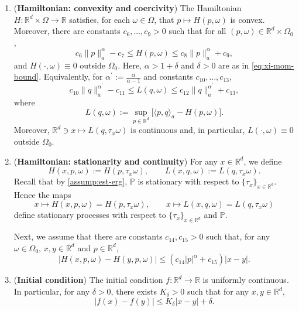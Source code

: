 \documentclass[11pt]{article}
\newcommand{\R}{\mathbb R}
\renewcommand{\P}{\mathbb P}
\theoremstyle{rem}
\begin{document}
\begin{enumerate}[label=\textbf{(H\arabic*)}]
\itemsep0.2em

\item \label{f2} ({\bf Hamiltonian: convexity and coercivity})
The Hamiltonian $H:\R^d\times\Omega\to\R$ satisfies, for each
$\omega\in\Omega$, that $p\mapsto H(p,\omega)$ is convex. Moreover, there are constants $c_6,\dots,c_9>0$ such that for all
$(p,\omega)\in\R^d\times\Omega_0$,
\begin{equation}\label{eq:H1-H}
c_6\|p\|_a^\alpha-c_7
\leq
H(p,\omega)
\leq
c_8\|p\|_a^\alpha+c_9,
\end{equation}
and $H(\cdot,\omega)\equiv 0$ outside $\Omega_0$. Here, $\alpha>1+\delta$ and $\delta>0$ are as in \eqref{eq:xi-mom-bound}. Equivalently, for
$\alpha^\prime:=\frac{\alpha}{\alpha-1}$ and constants $c_{10},\dots,c_{13}$,
\begin{equation}\label{eq:H1-L}
c_{10}\|q\|_a^{\alpha^\prime}-c_{11}
\leq
L(q,\omega)
\leq
c_{12}\|q\|_a^{\alpha^\prime}+c_{13},
\end{equation}
where
\begin{equation}\label{def L}
L(q,\omega):=\sup_{p\in\R^d}
\big[
\langle p,q\rangle_a-H(p,\omega)
\big].
\end{equation}
Moreover, $\R^d\ni x\mapsto L(q,\tau_x\omega)$ is continuous and, in particular,
$L(\cdot,\omega)\equiv 0$ outside $\Omega_0$.

\item \label{f3} ({\bf Hamiltonian: stationarity and continuity})
For any $x\in\R^d$, we define
\[
H(x,p,\omega):=H(p,\tau_x\omega),
\qquad
L(x,q,\omega):=L(q,\tau_x\omega).
\]
Recall that by \ref{assump:est-erg}, $\P$ is stationary with respect to
$\{\tau_x\}_{x\in\R^d}$. Hence the maps
\[
x\mapsto H(x,p,\omega)=H(p,\tau_x\omega),
\qquad
x\mapsto L(x,q,\omega)=L(q,\tau_x\omega)
\]
define stationary processes with respect to $\{\tau_x\}_{x\in\R^d}$ and $\P$.

Next, we assume that there are constants $c_{14},c_{15}>0$ such that, for any
$\omega\in\Omega_0$, $x,y\in\R^d$ and $p\in\R^d$,
\begin{equation}\label{eq:H2}
|H(x,p,\omega)-H(y,p,\omega)|
\leq
(c_{14}|p|^\alpha+c_{15})|x-y|.
\end{equation}

\item \label{f4} ({\bf Initial condition})
The initial condition $f:\R^d\to\R$ is uniformly continuous. In particular, for any $\delta>0$, there exists $K_\delta>0$ such that for any $x,y\in\R^d$,
\begin{equation}
\label{eq:H6}
|f(x)-f(y)|
\leq
K_\delta |x-y|+\delta.
\end{equation}

\end{enumerate}
\end{document}
